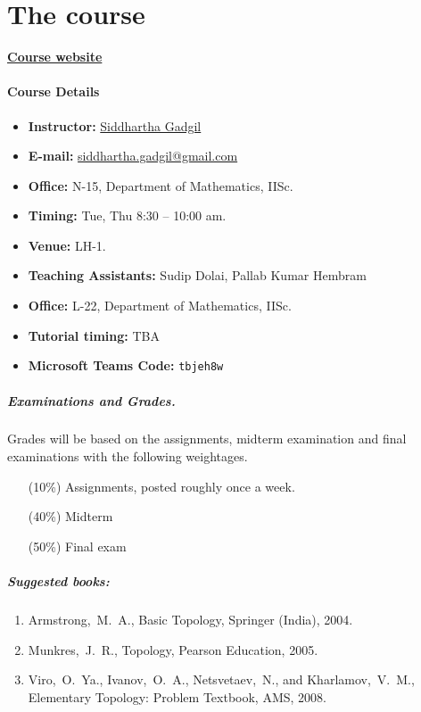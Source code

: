 \chapter*{The course}

\textbf{\href{https://math.iisc.ac.in/~gadgil/topology-2025/index.html}{Course website}}

\subsubsection{Course Details}
\begin{itemize}
    \item \textbf{Instructor:} \href{https://math.iisc.ac.in/~gadgil}{Siddhartha
      Gadgil}
    \item \textbf{E-mail:} \href{mailto:siddhartha.gadgil@gmail.com}{siddhartha.gadgil@gmail.com}
    \item \textbf{Office:} N-15, Department of Mathematics, IISc.
    \item \textbf{Timing:} Tue, Thu 8:30 -- 10:00 am.
    \item \textbf{Venue:} LH-1.
    \item \textbf{Teaching Assistants:} Sudip Dolai, Pallab Kumar Hembram
    \item \textbf{Office:} L-22, Department of Mathematics, IISc.
    \item \textbf{Tutorial timing:} TBA
    \item \textbf{Microsoft Teams Code:} \texttt{tbjeh8w}
\end{itemize}

\paragraph{Examinations and Grades.}\label{examinations-and-grades}
Grades will be based on the assignments, midterm examination and final
examinations with the following weightages.
\begin{itemize}
    \item[(10\%)] Assignments, posted roughly once a week.
    \item[(40\%)] Midterm
    \item[(50\%)] Final exam
\end{itemize}

\paragraph{Suggested books:}
\begin{enumerate}
    \item Armstrong,~M.~A., Basic Topology, Springer (India), 2004.
    \item Munkres,~J.~R., Topology, Pearson Education, 2005.
    \item Viro,~O.~Ya., Ivanov,~O.~A., Netsvetaev,~N., and Kharlamov,~V.~M.,
      Elementary Topology: Problem Textbook, AMS, 2008.
\end{enumerate}

